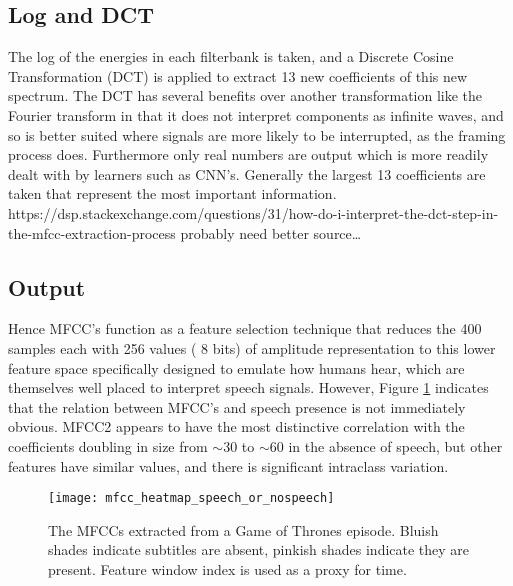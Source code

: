 \subsection{Log and DCT}
The log of the energies in each filterbank is taken, and a Discrete Cosine Transformation (DCT) is applied to extract 13 new coefficients of this new spectrum. The DCT has several benefits over another transformation like the Fourier transform in that it does not interpret components as infinite waves, and so is better suited where signals are more likely to be interrupted, as the framing process does. Furthermore only real numbers are output which is more readily dealt with by learners such as CNN’s. 
\newline
Generally the largest 13 coefficients are taken that represent the most important information.
https://dsp.stackexchange.com/questions/31/how-do-i-interpret-the-dct-step-in-the-mfcc-extraction-process 
probably need better source…

\subsection{Output}
Hence MFCC’s function as a feature selection technique that reduces the 400 samples each with 256 values ( 8 bits) of amplitude representation to this lower feature space specifically designed to emulate how humans hear, which are themselves well placed to interpret speech signals. However, Figure \ref{mfccs_speech_orno} indicates that the relation between MFCC's and speech presence is not immediately obvious. MFCC2 appears to have the most distinctive correlation with the coefficients doubling in size from $\sim$30 to $\sim$60 in the absence of speech, but other features have similar values, and there is significant intraclass variation.

\begin{figure}[h]
	\texttt{[image: mfcc\_heatmap\_speech\_or\_nospeech]}
	\caption{The MFCCs extracted from a Game of Thrones episode. Bluish shades indicate subtitles are absent, pinkish shades indicate they are present. Feature window index is used as a proxy for time.}
	\label{mfccs_speech_orno}
\end{figure}

